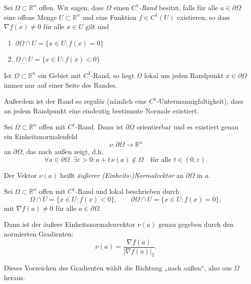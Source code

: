 \documentclass[11pt, a4paper]{article}
\begin{document}
\begin{definition}
 Sei $\Omega \subset \mathbb{R}^n$ offen. 
Wir sagen, dass $\Omega$ einen \emph{$C^1$-Rand} besitzt, 
falls für alle $a \in \partial \Omega$ eine offene Menge 
$U \subset \mathbb{R}^n$ und eine Funktion $f \in C^1(U)$ 
existieren, so dass $\nabla f(x) \neq 0$ für alle $x \in U$ gilt und

\begin{enumerate}[label=\alph*)]
\item $\partial \Omega \cap U = \{ x \in U : f(x) = 0 \}$
\item $\Omega \cap U = \{ x \in U : f(x) < 0 \}$
\end{enumerate}

Ist $\Omega \subset \mathbb{R}^n$ ein Gebiet mit $C^1$-Rand, 
so liegt $\Omega$ lokal um jeden Randpunkt $x \in \partial \Omega$ 
immer nur auf einer Seite des Randes. 

Außerdem ist der Rand so regulär (nämlich eine $C^1$-Untermannigfaltigkeit), 
dass an jedem Randpunkt eine eindeutig bestimmte Normale existiert.
\end{definition}

\begin{lemma} Sei $\Omega \subset \mathbb{R}^n$ offen mit $C^1$-Rand.  
Dann ist $\partial \Omega$ orientierbar und es existiert genau ein 
Einheitsnormalenfeld 
\[
\nu : \partial \Omega \to \mathbb{R}^n
\] 
an $\partial \Omega$, das nach außen zeigt, d.h.
\[
\forall a \in \partial \Omega \;\; \exists \varepsilon > 0 : 
a + t \, \nu(a) \notin \Omega \quad \text{für alle } t \in (0, \varepsilon).
\]

Der Vektor $\nu(a)$ heißt \emph{äußerer (Einheits-)Normalvektor} an 
$\partial \Omega$ in $a$.
\end{lemma}

\begin{note} Sei $\Omega \subset \mathbb{R}^n$ offen mit $C^1$-Rand und lokal beschrieben durch
\[
\Omega \cap U = \{ x \in U : f(x) < 0 \}, \qquad 
\partial \Omega \cap U = \{ x \in U : f(x) = 0 \}, 
\]
mit $\nabla f(a) \neq 0$ für alle $a \in \partial \Omega$.  

Dann ist der äußere Einheitsnormalenvektor $\nu(a)$ genau gegeben durch den normierten Gradienten:
\[
\nu(a) = \frac{\nabla f(a)}{|\nabla f(a)|_2}.
\]

Dieses Vorzeichen des Gradienten wählt die Richtung „nach außen“, also aus $\Omega$ heraus.
\end{note}
\end{document}
